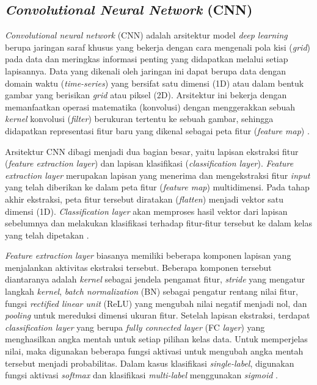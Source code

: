 \subsection{\textit{Convolutional Neural Network} (CNN)} \label{II.Teori7}
\textit{Convolutional neural network} (CNN) adalah arsitektur model \textit{deep learning} berupa jaringan saraf khusus yang bekerja dengan cara mengenali pola kisi (\textit{grid}) pada data dan meringkas informasi penting yang didapatkan melalui setiap lapisannya.
Data yang dikenali oleh jaringan ini dapat berupa data dengan domain waktu (\textit{time-series}) yang bersifat satu dimensi (1D) atau dalam bentuk gambar yang berisikan \textit{grid} atau piksel (2D).
Arsitektur ini bekerja dengan memanfaatkan operasi matematika (konvolusi) dengan menggerakkan sebuah \textit{kernel} konvolusi (\textit{filter}) berukuran tertentu ke sebuah gambar, sehingga didapatkan representasi fitur baru yang dikenal sebagai peta fitur (\textit{feature map}) \cite{goodfellow2016deep}. \par

Arsitektur CNN dibagi menjadi dua bagian besar, yaitu lapisan ekstraksi fitur (\textit{feature extraction layer}) dan lapisan klasifikasi (\textit{classification layer}).
\textit{Feature extraction layer} merupakan lapisan yang menerima dan mengekstraksi fitur \textit{input} yang telah diberikan ke dalam peta fitur (\textit{feature map}) multidimensi.
Pada tahap akhir ekstraksi, peta fitur tersebut diratakan (\textit{flatten}) menjadi vektor satu dimensi (1D).  
\textit{Classification layer} akan memproses hasil vektor dari lapisan sebelumnya dan melakukan klasifikasi terhadap fitur-fitur tersebut ke dalam kelas yang telah dipetakan \cite{goodfellow2016deep}. \par

\textit{Feature extraction layer} biasanya memiliki beberapa komponen lapisan yang menjalankan aktivitas ekstraksi tersebut.
Beberapa komponen tersebut diantaranya adalah \textit{kernel} sebagai jendela pengamat fitur, \textit{stride} yang mengatur langkah \textit{kernel}, \textit{batch normalization} (BN) sebagai pengatur rentang nilai fitur, fungsi \textit{rectified linear unit} (ReLU) yang mengubah nilai negatif menjadi nol, dan \textit{pooling} untuk mereduksi dimensi ukuran fitur.
Setelah lapisan ekstraksi, terdapat \textit{classification layer} yang berupa \textit{fully connected layer} (FC \textit{layer}) yang menghasilkan angka mentah untuk setiap pilihan kelas data.
Untuk memperjelas nilai, maka digunakan beberapa fungsi aktivasi untuk mengubah angka mentah tersebut menjadi probabilitas.
Dalam kasus klasifikasi \textit{single-label}, digunakan fungsi aktivasi \textit{softmax} dan klasifikasi \textit{multi-label} menggunakan \textit{sigmoid} \cite{goodfellow2016deep}. \par

